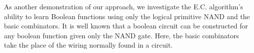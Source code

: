 \documentclass{article}
\begin{document}
As another demonstration of our approach, we investigate the
E.C. algorithm's ability to learn Boolean functions using only the logical
primitive NAND and the basic combinators. It is well known that a
boolean circuit can be constructed for any boolean function given only
the NAND gate. Here, the basic combinators take the place of the
wiring normally found in a circuit.






\end{document}
